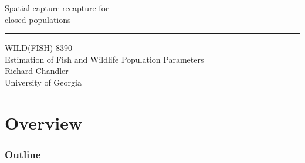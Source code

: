 \documentclass[color=usenames,dvipsnames]{beamer}\usepackage[]{graphicx}\usepackage[]{color}
\begin{document}
    



\begin{frame}[plain]
  \LARGE
  \centering
  {
    \LARGE Spatial capture-recapture %
    for \\ closed populations \\
  }
  {\color{default} \rule{\textwidth}{0.1pt} }
  \vfill
  \large
  WILD(FISH) 8390 \\
  Estimation of Fish and Wildlife Population Parameters \\
  \vfill
  \large
  Richard Chandler \\
  University of Georgia \\
\end{frame}






\section{Overview}



\begin{frame}[plain]
  \frametitle{Outline}
  \Large
\end{frame}
\end{document}
